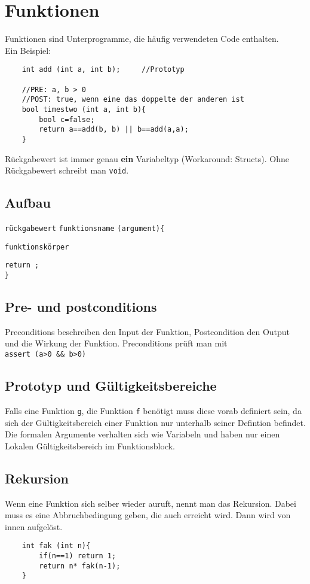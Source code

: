 \section{Funktionen}
Funktionen sind Unterprogramme, die häufig verwendeten Code enthalten.\\
Ein Beispiel:
\begin{lstlisting}
	int add (int a, int b); 	//Prototyp
	
	//PRE: a, b > 0
	//POST: true, wenn eine das doppelte der anderen ist
	bool timestwo (int a, int b){
		bool c=false;
		return a==add(b, b) || b==add(a,a);
	}
\end{lstlisting}
Rückgabewert ist immer genau \textbf{ein} Variabeltyp (Workaround: Structs). Ohne Rückgabewert schreibt man \texttt{void}.
\subsection{Aufbau}
\texttt{rückgabewert} \texttt{funktionsname} \texttt{(argument)}\texttt{\{}

\hspace{10pt}\texttt{funktionskörper}

\hspace{10pt}\texttt{return ;}\\
\texttt{\}}
\subsection{Pre- und postconditions}
Preconditions beschreiben den Input der Funktion, Postcondition den Output und die Wirkung der Funktion. Preconditions prüft man mit\\ \texttt{assert (a>0 \&\& b>0)}
\subsection{Prototyp und Gültigkeitsbereiche}
Falls eine Funktion \texttt{g}, die Funktion \texttt{f} benötigt muss diese vorab definiert sein, da sich der Gültigkeitsbereich einer Funktion nur unterhalb seiner Defintion befindet. Die formalen Argumente verhalten sich wie Variabeln und haben nur einen Lokalen Gültigkeitsbereich im Funktionsblock.
\subsection{Rekursion}
Wenn eine Funktion sich selber wieder auruft, nennt man das Rekursion. Dabei muss es eine Abbruchbedingung geben, die auch erreicht wird. Dann wird von innen aufgelöst.
\begin{lstlisting}
	int fak (int n){
		if(n==1) return 1;
		return n* fak(n-1);
	}
\end{lstlisting}



